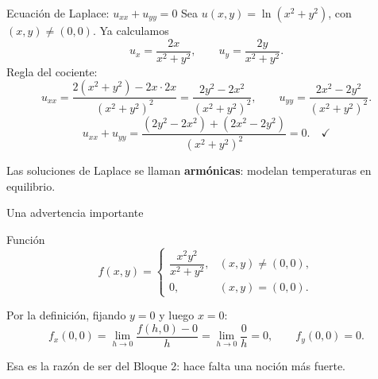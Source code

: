 \documentclass[11pt,aspectratio=169]{beamer}
\begin{document}
\begin{frame}{Ecuación de Laplace: $u_{xx}+u_{yy}=0$}
  Sea $u(x,y)=\ln(x^2+y^2)$, con $(x,y)\neq(0,0)$. Ya calculamos
  \[
    u_x=\frac{2x}{x^2+y^2},\qquad u_y=\frac{2y}{x^2+y^2}.
  \]
  \pause
  Regla del cociente:
  \[
    u_{xx}=\frac{2(x^2+y^2)-2x\cdot 2x}{(x^2+y^2)^2}=\frac{2y^2-2x^2}{(x^2+y^2)^2},
    \qquad
    u_{yy}=\frac{2x^2-2y^2}{(x^2+y^2)^2}.
  \]
  \pause
  \[
    u_{xx}+u_{yy}=\frac{(2y^2-2x^2)+(2x^2-2y^2)}{(x^2+y^2)^2}=0.\quad\checkmark
  \]
  \pause
  \begin{center}\small\color{gray60} Las soluciones de Laplace se llaman \textbf{armónicas}: modelan temperaturas en equilibrio.\end{center}
\end{frame}

\begin{frame}{Una advertencia importante}
  \begin{block}{Función}
    \[
      f(x,y)=\begin{cases}\dfrac{x^2y^2}{x^2+y^2}, & (x,y)\neq(0,0),\\[8pt] 0, & (x,y)=(0,0).\end{cases}
    \]
  \end{block}
  \pause
  Por la definición, fijando $y=0$ y luego $x=0$:
  \[
    f_x(0,0)=\lim_{h\to 0}\frac{f(h,0)-0}{h}=\lim_{h\to 0}\frac{0}{h}=0,
    \qquad
    f_y(0,0)=0.
  \]
  \pause
  \pause
  \begin{center}\small\color{gray60} Esa es la razón de ser del Bloque 2: hace falta una noción más fuerte.\end{center}
\end{frame}

\end{document}
